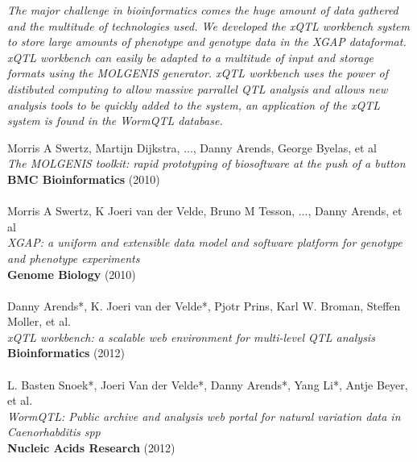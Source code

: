 \documentclass[8pt, twoside, a5paper]{report}
\newenvironment{myexampleblock}[1]{%
    \tcolorbox[beamer,%
    noparskip,breakable,
    colback=LightGreen,colframe=DarkGreen,%
    colbacklower=LimeGreen!75!LightGreen,%
    title=#1]}%
    {\endtcolorbox}
\newcommand{\authors}[1]{\small{#1}}
\newcommand{\bold}[1]{{\bfseries #1}}
\begin{document}
\emph{The major challenge in bioinformatics comes the huge amount of data gathered and the multitude of technologies used. We developed 
the xQTL workbench system\cite{Arends:2012} to store large amounts of phenotype and genotype data in the XGAP\cite{Swertz:2010a} 
dataformat. xQTL workbench can easily be adapted to a multitude of input and storage formats using the MOLGENIS\cite{Swertz:2004} 
generator. xQTL workbench uses the power of distibuted computing to allow massive parrallel QTL analysis and allows new analysis 
tools to be quickly added to the system, an application of the xQTL system is found in the WormQTL database\cite{Snoek:2012}.}

\null
\vfill

\begin{myexampleblock}{Originally published as:}
  \authors{Morris A Swertz, Martijn Dijkstra, ..., Danny Arends, George Byelas, et al}\\
  \emph{The MOLGENIS toolkit: rapid prototyping of biosoftware at the push of a button}\\
  \bold{BMC Bioinformatics} (2010)\\\\

  \authors{Morris A Swertz, K Joeri van der Velde, Bruno M Tesson, ..., Danny Arends, et al}\\
  \emph{XGAP: a uniform and extensible data model and software platform for genotype and phenotype experiments}\\
  \bold{Genome Biology} (2010)\\\\

  \authors{Danny Arends*, K. Joeri van der Velde*, Pjotr Prins, Karl W. Broman, Steffen Moller, et al.}\\
  \emph{xQTL workbench: a scalable web environment for multi-level QTL analysis}\\
  \bold{Bioinformatics} (2012)\\\\

  \authors{L. Basten Snoek*, Joeri Van der Velde*, Danny Arends*, Yang Li*, Antje Beyer, et al.}\\
  \emph{WormQTL: Public archive and analysis web portal for natural variation data in Caenorhabditis spp}\\
  \bold{Nucleic Acids Research} (2012)
\end{myexampleblock}

\newpage
\end{document}
